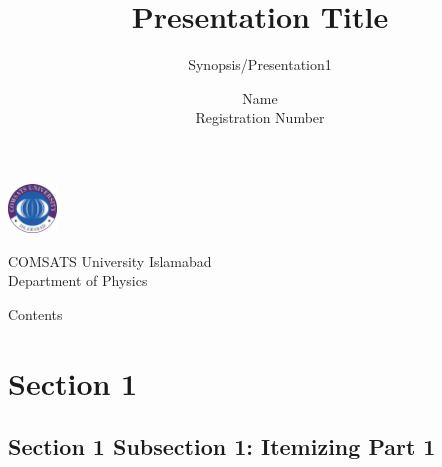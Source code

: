 \documentclass[aspectratio=169, 9pt]{beamer}
\author[Name \quad \quad Registration Number ]{Name \\ Registration Number}
\title{Presentation Title}
\subtitle{Synopsis/Presentation1} %
\institute[CUI] %
{
    {\small Supervisor} \\ \vspace{0.5mm} {\normalsize Supervisor Name} \vspace{5mm}
}
\begin{document}

\begin{frame}[plain]
    \begin{center}
            \begin{minipage}[c]{0.2\linewidth}
                    \begin{center}
                    \includegraphics[width=1.3cm, height=1.3cm]{./Graphics/CUI-Logo.png} 
                    \end{center}
            \end{minipage}
            \begin{minipage}[c]{0.5\linewidth}
                    \begin{center}
                    \begin{large}
                    COMSATS University Islamabad \\ \vspace{1mm}Department of Physics
                    \end{large} 
                    \end{center}
            \end{minipage}
    \end{center}
\titlepage 
\end{frame}


\begingroup 
    \begin{frame}{Contents}
        \tableofcontents{}
    \end{frame}
\endgroup



\section{Section 1}

\subsection{Section 1 Subsection 1: Itemizing Part 1}
\end{document}
